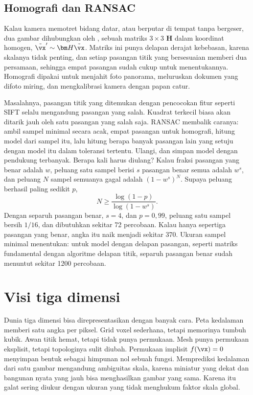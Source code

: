\subsection{Homografi dan RANSAC}

Kalau kamera memotret bidang datar, atau berputar di tempat tanpa bergeser, dua gambar dihubungkan oleh
, sebuah matriks $3\times3$ $\bm H$ dalam koordinat homogen, $\tilde\vx'\sim\bm H\tilde\vx$. Matriks ini
punya delapan derajat kebebasan, karena skalanya tidak penting, dan setiap pasangan titik yang bersesuaian memberi dua
persamaan, sehingga empat pasangan sudah cukup untuk menentukannya. Homografi dipakai untuk menjahit foto panorama,
meluruskan dokumen yang difoto miring, dan mengkalibrasi kamera dengan papan catur.

Masalahnya, pasangan titik yang ditemukan dengan pencocokan fitur seperti SIFT selalu mengandung pasangan yang salah.
Kuadrat terkecil biasa akan ditarik jauh oleh satu pasangan yang salah saja. RANSAC \citep{fischler1981} membalik caranya:
ambil sampel minimal secara acak, empat pasangan untuk homografi, hitung model dari sampel itu, lalu hitung berapa banyak
pasangan lain yang setuju dengan model itu dalam toleransi tertentu. Ulangi, dan simpan model dengan pendukung terbanyak.
Berapa kali harus diulang? Kalau fraksi pasangan yang benar adalah $w$, peluang satu sampel berisi $s$ pasangan benar
semua adalah $w^s$, dan peluang $N$ sampel semuanya gagal adalah $(1-w^s)^N$. Supaya peluang berhasil paling sedikit $p$,
\begin{equation}
N\ge\frac{\log(1-p)}{\log(1-w^s)}.
\end{equation}
Dengan separuh pasangan benar, $s=4$, dan $p=0{,}99$, peluang satu sampel bersih $1/16$, dan dibutuhkan sekitar 72 percobaan.
Kalau hanya sepertiga pasangan yang benar, angka itu naik menjadi sekitar 370. Ukuran sampel minimal menentukan:
untuk model dengan delapan pasangan, seperti matriks fundamental dengan algoritme delapan titik, separuh pasangan benar
sudah menuntut sekitar 1200 percobaan.

\section{Visi tiga dimensi}

Dunia tiga dimensi bisa direpresentasikan dengan banyak cara. Peta kedalaman memberi satu angka
per piksel. Grid voxel sederhana, tetapi memorinya tumbuh kubik. Awan titik hemat, tetapi tidak
punya permukaan. Mesh punya permukaan eksplisit, tetapi topologinya sulit diubah. Permukaan
implisit $f(\vx)=0$ menyimpan bentuk sebagai himpunan nol sebuah fungsi. Memprediksi kedalaman
dari satu gambar mengandung ambiguitas skala, karena miniatur yang dekat dan bangunan nyata yang
jauh bisa menghasilkan gambar yang sama. Karena itu galat sering diukur dengan ukuran yang tidak
menghukum faktor skala global.

